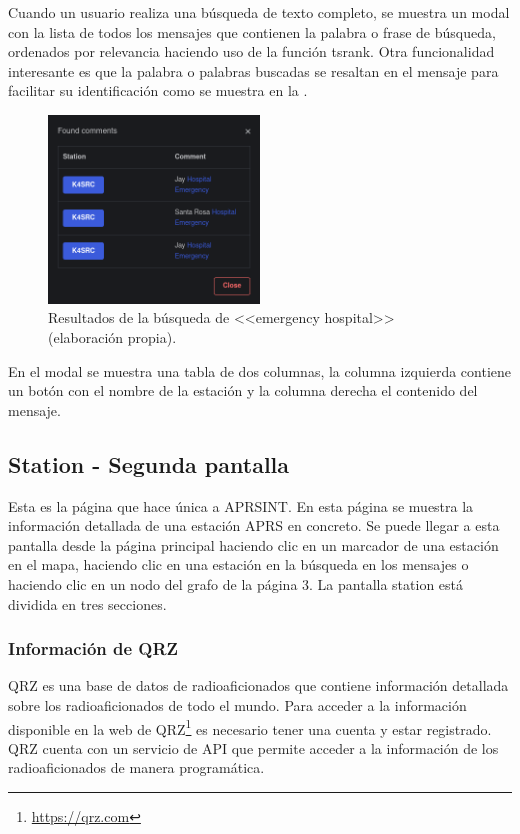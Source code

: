 Cuando un usuario realiza una búsqueda de texto completo, se muestra un modal con la lista de todos los mensajes que contienen la palabra o frase de búsqueda, ordenados por relevancia haciendo uso de la función ts\textunderscore rank. Otra funcionalidad interesante es que la palabra o palabras buscadas se resaltan en el mensaje para facilitar su identificación como se muestra en la .

\begin{figure}[h]
	\centering
	\includegraphics[width=0.5\textwidth]{Imagenes/Chapter_4/fts_output.png}
	\caption[Resultados de la búsqueda de <<emergency hospital>>.]{Resultados de la búsqueda de <<emergency hospital>> (elaboración propia).}
	\label{fig:postgres-fts}
\end{figure}

\noindent En el modal se muestra una tabla de dos columnas, la columna izquierda contiene un botón con el nombre de la estación y la columna derecha el contenido del mensaje.

\subsection{Station - Segunda pantalla}
Esta es la página que hace única a APRSINT. En esta página se muestra la información detallada de una estación APRS en concreto. Se puede llegar a esta pantalla desde la página principal haciendo clic en un marcador de una estación en el mapa, haciendo clic en una estación en la búsqueda en los mensajes o haciendo clic en un nodo del grafo de la página 3. La pantalla station está dividida en tres secciones.

\subsubsection*{Información de QRZ}
QRZ es una base de datos de radioaficionados que contiene información detallada sobre los radioaficionados de todo el mundo. Para acceder a la información disponible en la web de QRZ\footnote{\url{https://qrz.com}} es necesario tener una cuenta y estar registrado. QRZ cuenta con un servicio de API que permite acceder a la información de los radioaficionados de manera programática.

